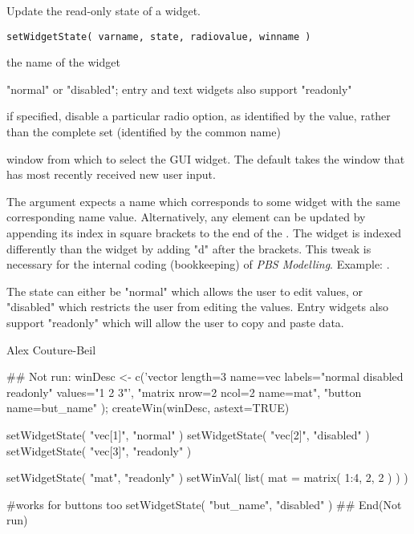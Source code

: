 \documentclass[letterpaper]{book}
\begin{document}
\begin{Description}\relax
Update the read-only state of a widget.
\end{Description}
\begin{Usage}
\begin{verbatim}
setWidgetState( varname, state, radiovalue, winname )
\end{verbatim}
\end{Usage}
\begin{Arguments}
\begin{ldescription}
\item[\code{varname}] the name of the widget
\item[\code{state}] "normal" or "disabled"; entry and text widgets also support "readonly"
\item[\code{radiovalue}] if specified, disable a particular radio option, as identified by the value, rather than the complete set (identified by the common name)
\item[\code{winname}] window from which to select the GUI widget. The default 
takes the window that has most recently received new user input.
\end{ldescription}
\end{Arguments}
\begin{Details}\relax
The  argument expects a name which corresponds to some widget with the same corresponding name value.
Alternatively, any element can be updated by appending its index in square brackets 
to the end of the . The  widget is indexed differently 
than the  widget by adding "d" after the brackets. This tweak is necessary 
for the internal coding (bookkeeping) of \emph{PBS Modelling}. Example: .

The state can either be "normal" which allows the user to edit values, or "disabled" which
restricts the user from editing the values. Entry widgets also support "readonly" which will
allow the user to copy and paste data.
\end{Details}
\begin{Author}\relax
Alex Couture-Beil
\end{Author}
\begin{Examples}
\begin{ExampleCode}
## Not run: 
winDesc <- c('vector length=3 name=vec labels="normal disabled readonly" values="1 2 3"',
             "matrix nrow=2 ncol=2 name=mat", "button name=but_name" );
createWin(winDesc, astext=TRUE)

setWidgetState( "vec[1]", "normal" )
setWidgetState( "vec[2]", "disabled" )
setWidgetState( "vec[3]", "readonly" )

setWidgetState( "mat", "readonly" )
setWinVal( list( mat = matrix( 1:4, 2, 2 ) ) )

#works for buttons too
setWidgetState( "but_name", "disabled" )
## End(Not run)
\end{ExampleCode}
\end{Examples}
\end{document}
